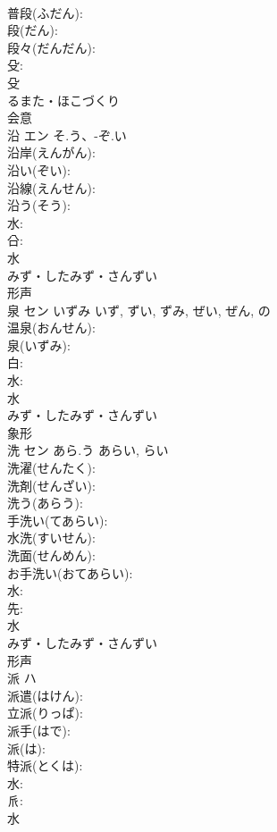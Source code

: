 \documentclass[8pt]{extreport}
\begin{document}
\begin{CJK}{UTF8}{min}
\\	普段(ふだん): 
\\	段(だん): 
\\	段々(だんだん): 
\\	殳: 
\\	殳	
\\	るまた・ほこづくり	
\\	会意 
\\	沿	エン	そ.う、-ぞ.い		
\\	沿岸(えんがん): 
\\	沿い(ぞい): 
\\	沿線(えんせん): 
\\	沿う(そう): 
\\	水: 
\\	㕣: 
\\	水	
\\	みず・したみず・さんずい	
\\	形声 
\\	泉	セン	いずみ	いず, ずい, ずみ, ぜい, ぜん, の	
\\	温泉(おんせん): 
\\	泉(いずみ): 
\\	白: 
\\	水: 
\\	水	
\\	みず・したみず・さんずい	
\\	象形 
\\	洗	セン	あら.う	あらい, らい	
\\	洗濯(せんたく): 
\\	洗剤(せんざい): 
\\	洗う(あらう): 
\\	手洗い(てあらい): 
\\	水洗(すいせん): 
\\	洗面(せんめん): 
\\	お手洗い(おてあらい): 
\\	水: 
\\	先: 
\\	水	
\\	みず・したみず・さんずい	
\\	形声 
\\	派	ハ			
\\	派遣(はけん): 
\\	立派(りっぱ): 
\\	派手(はで): 
\\	派(は): 
\\	特派(とくは): 
\\	水: 
\\	𠂢: 
\\	水	

\end{CJK}
\end{document}
